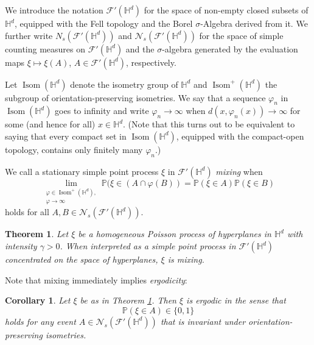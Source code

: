 \documentclass[12pt,a4paper]{article}
\newtheorem{theorem}[proposition]{Theorem}
\newtheorem{corollary}[proposition]{Corollary}
\theoremstyle{definition}
\renewcommand{\H}{\mathbb{H}}
\renewcommand{\P}{\mathbb{P}}
\DeclareMathOperator{\Isom}{Isom}
\begin{document}
We introduce the notation \(\mathcal{F}'(\H^d)\) for the space of non-empty closed subsets of \(\H^d\), equipped with the Fell topology and the Borel \(\sigma\)-Algebra derived from it.
We further write \(N_s(\mathcal{F}'(\H^d))\) and \(\mathcal{N}_s(\mathcal{F}'(\H^d))\) for the space of simple counting measures on \(\mathcal{F}'(\H^d)\) and the \(\sigma\)-algebra generated by the evaluation maps \(\xi \mapsto \xi(A)\), \(A \in \mathcal{F}'(\H^d)\), respectively.

Let \(\Isom(\H^d)\) denote the isometry group of \(\H^d\) and \(\Isom^+(\H^d)\) the subgroup of orientation-preserving isometries.
We say that a sequence \(\varphi_n\) in \(\Isom(\H^d)\) goes to infinity and write \(\varphi_n \to \infty\) when \(d(x,\varphi_n(x)) \to \infty\) for some (and hence for all) \(x \in \H^d\).
(Note that this turns out to be equivalent to saying that every compact set in \(\Isom(\H^d)\), equipped with the compact-open topology, contains only finitely many \(\varphi_n\).)

We call a stationary simple point process \(\xi\) in \(\mathcal{F}'(\H^d)\) \emph{mixing} when
\begin{equation}\label{eq:mixing}
    \lim_{\substack{\varphi \in \Isom^+(\H^d),\\\varphi \to \infty}} \P(\xi \in (A \cap \varphi(B)) = \P(\xi \in A) \P(\xi \in B)
\end{equation}
holds for all \(A,B \in \mathcal{N}_s(\mathcal{F}'(\H^d))\).



\begin{theorem}
    \label{thm:mixing}
    Let \(\xi\) be a homogeneous Poisson process of hyperplanes in \(\H^d\) with intensity \(\gamma > 0\).
    When interpreted as a simple point process in \(\mathcal{F}'(\H^d)\) concentrated on the space of hyperplanes, \(\xi\) is mixing.
\end{theorem}

Note that mixing immediately implies \emph{ergodicity}:

\begin{corollary}
\label{cor:ergodic}
    Let \(\xi\) be as in Theorem \ref{thm:mixing}.
    Then \(\xi\) is ergodic in the sense that
    \begin{equation*}
        \P(\xi \in A) \in \{0,1\}
    \end{equation*}
    holds for any event \(A \in \mathcal{N}_s(\mathcal{F}'(\H^d))\) that is invariant under orientation-preserving isometries.
\end{corollary}
\end{document}
